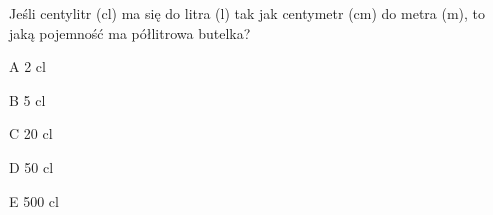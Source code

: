 \begin{tresc}
Jeśli centylitr (cl) ma się do litra (l) tak jak centymetr (cm) do metra (m), to jaką pojemność ma półlitrowa butelka?
\end{tresc}
\begin{wariant}{A} 2 cl \end{wariant}
\begin{wariant}{B} 5 cl \end{wariant}
\begin{wariant}{C} 20 cl \end{wariant}
\begin{wariant}{D} 50 cl \end{wariant}
\begin{wariant}{E} 500 cl \end{wariant}
